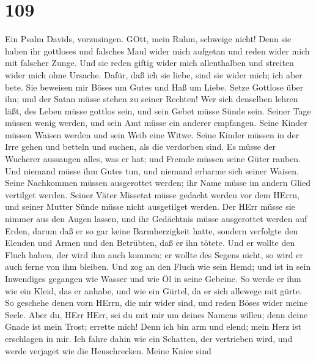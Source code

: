 \hypertarget{section-108}{%
\section{109}\label{section-108}}

 Ein Psalm Davids, vorzusingen. GOtt, mein Ruhm, schweige
nicht!  Denn sie haben ihr gottloses und falsches Maul wider
mich aufgetan und reden wider mich mit falscher Zunge.  Und
sie reden giftig wider mich allenthalben und streiten wider mich ohne
Ursache.  Dafür, daß ich sie liebe, sind sie wider mich; ich
aber bete.  Sie beweisen mir Böses um Gutes und Haß um
Liebe.  Setze Gottlose über ihn; und der Satan müsse stehen
zu seiner Rechten!  Wer sich denselben lehren läßt, des
Leben müsse gottlos sein, und sein Gebet müsse Sünde sein. 
Seiner Tage müssen wenig werden, und sein Amt müsse ein anderer
empfangen.  Seine Kinder müssen Waisen werden und sein Weib
eine Witwe.  Seine Kinder müssen in der Irre gehen und
betteln und suchen, als die verdorben sind.  Es müsse der
Wucherer aussaugen alles, was er hat; und Fremde müssen seine Güter
rauben.  Und niemand müsse ihm Gutes tun, und niemand
erbarme sich seiner Waisen.  Seine Nachkommen müssen
ausgerottet werden; ihr Name müsse im andern Glied vertilget werden.
 Seiner Väter Missetat müsse gedacht werden vor dem HErrn,
und seiner Mutter Sünde müsse nicht ausgetilget werden. 
Der HErr müsse sie nimmer aus den Augen lassen, und ihr Gedächtnis müsse
ausgerottet werden auf Erden,  darum daß er so gar keine
Barmherzigkeit hatte, sondern verfolgte den Elenden und Armen und den
Betrübten, daß er ihn tötete.  Und er wollte den Fluch
haben, der wird ihm auch kommen; er wollte des Segens nicht, so wird er
auch ferne von ihm bleiben.  Und zog an den Fluch wie sein
Hemd; und ist in sein Inwendiges gegangen wie Wasser und wie Öl in seine
Gebeine.  So werde er ihm wie ein Kleid, das er anhabe, und
wie ein Gürtel, da er sich allewege mit gürte.  So geschehe
denen vorn HErrn, die mir wider sind, und reden Böses wider meine Seele.
 Aber du, HErr HErr, sei du mit mir um deines Namens
willen; denn deine Gnade ist mein Trost; errette mich! 
Denn ich bin arm und elend; mein Herz ist erschlagen in mir.
 Ich fahre dahin wie ein Schatten, der vertrieben wird, und
werde verjaget wie die Heuschrecken.  Meine Kniee sind
